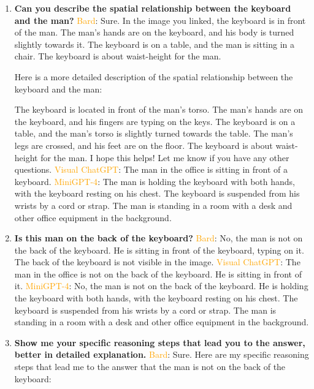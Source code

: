     \begin{enumerate}
        \item \textbf{Can you describe the spatial relationship between the keyboard and the man?}
        \subitem \textcolor{orange}{Bard}: 
        Sure. In the image you linked, the keyboard is in front of the man. The man's hands are on the keyboard, and his body is turned slightly towards it. The keyboard is on a table, and the man is sitting in a chair. The keyboard is about waist-height for the man.

        Here is a more detailed description of the spatial relationship between the keyboard and the man:

        The keyboard is located in front of the man's torso.
        The man's hands are on the keyboard, and his fingers are typing on the keys.
        The keyboard is on a table, and the man's torso is slightly turned towards the table.
        The man's legs are crossed, and his feet are on the floor.
        The keyboard is about waist-height for the man.
        I hope this helps! Let me know if you have any other questions.
        \subitem \textcolor{orange}{Visual ChatGPT}: The man in the office is sitting in front of a keyboard.
        \subitem \textcolor{orange}{MiniGPT-4}: The man is holding the keyboard with both hands, with the keyboard resting on his chest. The keyboard is suspended from his wrists by a cord or strap. The man is standing in a room with a desk and other office equipment in the background.
        \item \textbf{Is this man on the back of the keyboard?}
        \subitem \textcolor{orange}{Bard}: 
        No, the man is not on the back of the keyboard. He is sitting in front of the keyboard, typing on it. The back of the keyboard is not visible in the image.
        \subitem \textcolor{orange}{Visual ChatGPT}: The man in the office is not on the back of the keyboard. He is sitting in front of it.
        \subitem \textcolor{orange}{MiniGPT-4}: No, the man is not on the back of the keyboard. He is holding the keyboard with both hands, with the keyboard resting on his chest. The keyboard is suspended from his wrists by a cord or strap. The man is standing in a room with a desk and other office equipment in the background.
        \item \textbf{Show me your specific reasoning steps that lead you to the answer, better in detailed explanation.}
        \subitem \textcolor{orange}{Bard}: 
        Sure. Here are my specific reasoning steps that lead me to the answer that the man is not on the back of the keyboard:
        

\end{enumerate}
